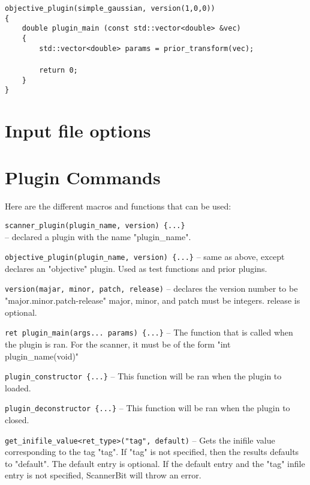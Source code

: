 \documentclass[11pt,a4paper]{article}
\newcommand{\tab}{${}$\ \ \ \ }
\begin{document}
\begin{linenumbers}
\texttt{objective\_plugin(simple\_gaussian, version(1,0,0))\\
\{\\
\tab double plugin\_main (const std::vector<double> \&vec)\\
\tab \{\\
\tab \tab std::vector<double> params = prior\_transform(vec);\\
\\
\tab \tab return 0;\\
\tab \}\\
\}}
\end{linenumbers}

\section{Input file options}

\section{Plugin Commands}
Here are the different macros and functions that can be used:

\texttt{scanner\_plugin(plugin\_name, version) \{...\}}\\
-- declared a plugin with the name "plugin\_name".
   
\texttt{objective\_plugin(plugin\_name, version) \{...\}}
-- same as above, except declares an "objective" plugin.
   Used as test functions and prior plugins.
   
\texttt{version(majar, minor, patch, release)}
-- declares the version number to be "major.minor.patch-release"
   major, minor, and patch must be integers.  release is optional.
   
\texttt{ret plugin\_main(args... params) \{...\}}
-- The function that is called when the plugin is ran.  For the
   scanner, it must be of the form "int plugin\_name(void)"
   
\texttt{plugin\_constructor \{...\}}
-- This function will be ran when the plugin to loaded.

\texttt{plugin\_deconstructor \{...\}}
-- This function will be ran when the plugin to closed.

\texttt{get\_inifile\_value<ret\_type>("tag", default)}
-- Gets the inifile value corresponding to the tag "tag".
   If "tag" is not specified, then the results defaults
   to "default".  The default entry is optional. If
   the default entry and the "tag" infile entry is not
   specified, ScannerBit will throw an error.
   
\end{document}
